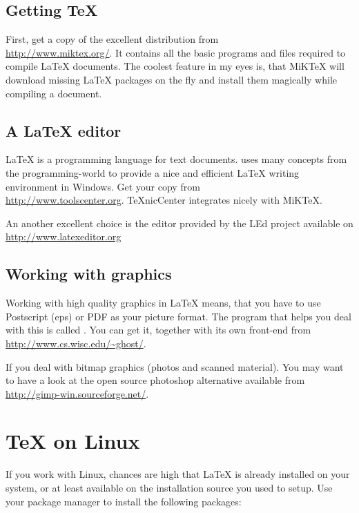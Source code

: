 \documentclass[11pt,a4paper,twoside]{book}
\begin{document}
\subsection{Getting \TeX{}}

First, get a copy of the excellent  distribution from\\
\url{http://www.miktex.org/}. It contains all the basic programs and files
required to compile \LaTeX{} documents.  The coolest feature in my eyes is,
that MiKTeX will download missing \LaTeX{} packages on the fly and install them
magically while compiling a document.

\subsection{A \LaTeX{} editor}

\LaTeX{} is a programming language for text documents. 
uses many concepts from the programming-world to provide a nice and
efficient \LaTeX{} writing environment in Windows. Get your copy from\\
\url{http://www.toolscenter.org}. TeXnicCenter integrates nicely with
MiKTeX.

An another excellent choice is the editor provided by the LEd project available on
\url{http://www.latexeditor.org}

\subsection{Working with graphics}

Working with high quality graphics in \LaTeX{} means, that you have to use
Postscript (eps) or PDF as your picture format. The program that helps you
deal with this is called . You can get it, together with its
own front-end  from \url{http://www.cs.wisc.edu/~ghost/}.

If you deal with bitmap graphics (photos and scanned material). You may want
to have a look at the open source photoshop alternative  available
from \url{http://gimp-win.sourceforge.net/}.

\section{\TeX{} on Linux}

If you work with Linux, chances are high that \LaTeX{} is already installed
on your system, or at least available on the installation source you used to
setup. Use your package manager to install the following packages:
\end{document}
